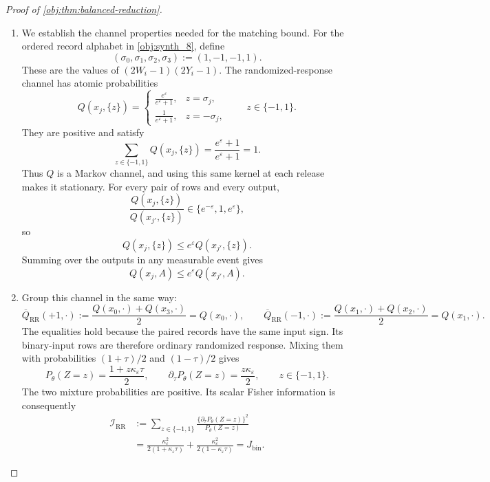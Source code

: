 \documentclass[11pt]{article}
\begin{document}
\begin{proof}[Proof of \cref{obj:thm:balanced-reduction}]
\begin{enumerate}
\item We establish the channel properties needed for the matching
bound. For the ordered record alphabet in \cref{obj:synth_8}, define
\[
(\sigma_0,\sigma_1,\sigma_2,\sigma_3):=(1,-1,-1,1).
\]
These are the values of \((2W_i-1)(2Y_i-1)\).
The randomized-response channel has atomic probabilities
\[
Q(x_j,\{z\})
=
\begin{cases}
\displaystyle\frac{e^\varepsilon}{e^\varepsilon+1},
&z=\sigma_j,\\[6pt]
\displaystyle\frac1{e^\varepsilon+1},
&z=-\sigma_j,
\end{cases}
\qquad z\in\{-1,1\}.
\]
They are positive and satisfy
\[
\sum_{z\in\{-1,1\}}Q(x_j,\{z\})
=\frac{e^\varepsilon+1}{e^\varepsilon+1}=1.
\]
Thus \(Q\) is a Markov channel, and using this same kernel at each
release makes it stationary. For every pair of rows and every output,
\[
\frac{Q(x_j,\{z\})}{Q(x_{j'},\{z\})}
\in\{e^{-\varepsilon},1,e^\varepsilon\},
\]
so
\[
Q(x_j,\{z\})\le e^\varepsilon Q(x_{j'},\{z\}).
\]
Summing over the outputs in any measurable event gives
\[
Q(x_j,A)\le e^\varepsilon Q(x_{j'},A).
\]

\item Group this channel in the same way:
\[
\overline Q_{\mathrm{RR}}(+1,\cdot)
:=\frac{Q(x_0,\cdot)+Q(x_3,\cdot)}2=Q(x_0,\cdot),
\qquad
\overline Q_{\mathrm{RR}}(-1,\cdot)
:=\frac{Q(x_1,\cdot)+Q(x_2,\cdot)}2=Q(x_1,\cdot).
\]
The equalities hold because the paired records have the same input
sign. Its binary-input rows are therefore ordinary randomized response.
Mixing them with probabilities \((1+\tau)/2\) and \((1-\tau)/2\) gives
\[
P_\theta(Z=z)=\frac{1+z\kappa_\varepsilon\tau}{2},
\qquad
\partial_\tau P_\theta(Z=z)=\frac{z\kappa_\varepsilon}{2},
\qquad z\in\{-1,1\}.
\]
The two mixture probabilities are positive. Its scalar Fisher
information is consequently
\[
\begin{aligned}
\mathcal I_{\mathrm{RR}}
&:=
\sum_{z\in\{-1,1\}}
\frac{\{\partial_\tau P_\theta(Z=z)\}^2}{P_\theta(Z=z)}\\
&=
\frac{\kappa_\varepsilon^2}{2(1+\kappa_\varepsilon\tau)}
+\frac{\kappa_\varepsilon^2}{2(1-\kappa_\varepsilon\tau)}
=J_{\mathrm{bin}}.
\end{aligned}
\]


\end{enumerate}
\end{proof}
\end{document}
